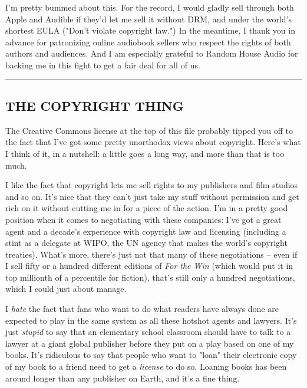 I'm pretty bummed about this. For the record, I would gladly sell
through both Apple and Audible if they'd let me sell it without
DRM, and under the world's shortest EULA ("Don't violate copyright
law.") In the meantime, I thank you in advance for patronizing
online audiobook sellers who respect the rights of both authors and
audiences. And I am especially grateful to Random House Audio for
backing me in this fight to get a fair deal for all of us.

\begin{center}\rule{3in}{0.4pt}\end{center}

\subsection{THE COPYRIGHT THING}

The Creative Commons license at the top of this file probably
tipped you off to the fact that I've got some pretty unorthodox
views about copyright. Here's what I think of it, in a nutshell: a
little goes a long way, and more than that is too much.

I like the fact that copyright lets me sell rights to my publishers
and film studios and so on. It's nice that they can't just take my
stuff without permission and get rich on it without cutting me in
for a piece of the action. I'm in a pretty good position when it
comes to negotiating with these companies: I've got a great agent
and a decade's experience with copyright law and licensing
(including a stint as a delegate at WIPO, the UN agency that makes
the world's copyright treaties). What's more, there's just not that
many of these negotiations -- even if I sell fifty or a hundred
different editions of \emph{For the Win} (which would put it in top
millionth of a percentile for fiction), that's still only a hundred
negotiations, which I could just about manage.

I \emph{hate} the fact that fans who want to do what readers have
always done are expected to play in the same system as all these
hotshot agents and lawyers. It's just \emph{stupid} to say that an
elementary school classroom should have to talk to a lawyer at a
giant global publisher before they put on a play based on one of my
books. It's ridiculous to say that people who want to "loan" their
electronic copy of my book to a friend need to get a \emph{license}
to do so. Loaning books has been around longer than any publisher
on Earth, and it's a fine thing.

